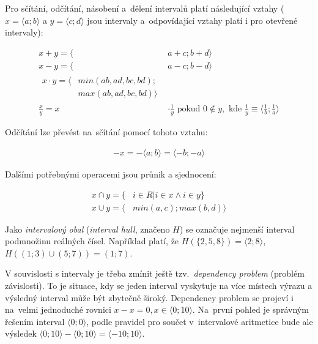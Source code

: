 Pro sčítání, odčítání, násobení a~dělení intervalů platí následující vztahy ($x = \langle a; b \rangle$ a $y = \langle c; d \rangle$ jsou intervaly a~odpovídající vztahy platí i pro otevřené intervaly):

\begin{subequations}
\begin{align}
   x+y = \langle & a + c;  b + d \rangle\\
   x-y = \langle & a - c;  b - d \rangle\\
   \begin{split}x  \cdot y = \langle & min(ab, ad, bc, bd); \\ & max(ab, ad, bc, bd) \rangle \end{split}\\
   \frac{x}{y} = x & \cdot \frac{1}{y} \mbox{ pokud } 0 \notin y, \mbox{ kde } \frac{1}{y} \equiv \langle  \frac{1}{b}; \frac{1}{a} \rangle
\end{align}
\end{subequations}

Odčítání lze převést na~sčítání pomocí tohoto vztahu:

\begin{subequations}
\begin{align}
   -x = - \langle a;b \rangle = \langle -b; -a \rangle
\end{align}
\end{subequations}


Dalšími potřebnými operacemi jsou průnik a sjednocení:

\begin{subequations}
\begin{align}
   x \cap y = \{ & i \in R | i \in x \wedge i \in y \} \\
   x \cup y = \langle & min(a, c); max(b, d) \rangle
\end{align}
\end{subequations}

Jako \emph{intervalový obal} (\emph{interval hull}, značeno $H$) se označuje nejmenší interval  podmnožinu reálných čísel. Například platí, že $H(\{2,5,8\}) = \langle 2; 8 \rangle$, $H((1;3) \cup (5;7)) = (1;7)$.

V souvislosti s intervaly je třeba zmínit ještě tzv.~\emph{dependency problem} (problém závislosti). To je situace, kdy se jeden interval vyskytuje na více místech výrazu a výsledný interval může být zbytečně široký. Dependency problem se projeví i na~velmi jednoduché rovnici $x - x = 0, x \in \langle 0;10 \rangle$. Na~první pohled je správným řešením interval $\langle 0;0\rangle$, podle pravidel pro součet v~intervalové aritmetice bude ale výsledek $\langle 0;10 \rangle - \langle 0;10\rangle = \langle -10; 10 \rangle$.



